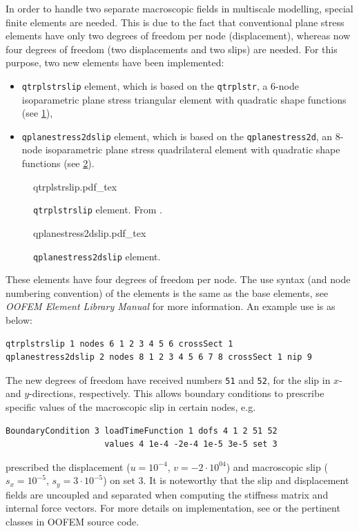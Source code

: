 \documentclass[11pt]{article}
\newcommand{\param}[1]{\texttt{#1}}
\begin{document}
In order to handle two separate macroscopic fields in multiscale modelling, special finite elements are needed. This is due to the fact that conventional plane stress elements have only two degrees of freedom per node (displacement), whereas now four degrees of freedom (two displacements and two slips) are needed. For this purpose, two new elements have been implemented:
\begin{itemize}
    \item \texttt{qtrplstrslip} element, which is based on the \texttt{qtrplstr}, a 6-node isoparametric plane stress triangular element with quadratic shape functions (see \cref{fig:qtrplstrslip}), 
    \item \texttt{qplanestress2dslip} element, which is based on the \texttt{qplanestress2d}, an 8-node isoparametric plane stress quadrilateral element with quadratic shape functions (see \cref{fig:qplanestress2dslip}).
\end{itemize}

\begin{figure}[H]
    \centering
    \def\svgwidth{0.5\textwidth}
    {qtrplstrslip.pdf_tex}
    \caption{\texttt{qtrplstrslip} element. From \cite{PaperB}.}
    \label{fig:qtrplstrslip}
\end{figure}

\begin{figure}[H]
    \centering
    \def\svgwidth{0.5\textwidth}
    {qplanestress2dslip.pdf_tex}
    \caption{\texttt{qplanestress2dslip} element.}
    \label{fig:qplanestress2dslip}
\end{figure}

\noindent These elements have four degrees of freedom per node. 
The use syntax (and node numbering convention) of the elements is the same as the base elements, see \textit{OOFEM Element Library Manual} for more information. An example use is as below:

\begin{lstlisting}[style=oofem,language=oofeminput]
qtrplstrslip 1 nodes 6 1 2 3 4 5 6 crossSect 1
qplanestress2dslip 2 nodes 8 1 2 3 4 5 6 7 8 crossSect 1 nip 9
\end{lstlisting}

The new degrees of freedom have received numbers \param{51} and \param{52}, for the slip in $x$- and $y$-directions, respectively. 
This allows boundary conditions to prescribe specific values of the macroscopic slip in certain nodes, e.g.
\begin{lstlisting}[style=oofem,language=oofeminput]
BoundaryCondition 3 loadTimeFunction 1 dofs 4 1 2 51 52 
                    values 4 1e-4 -2e-4 1e-5 3e-5 set 3
\end{lstlisting}
prescribed the displacement ($u = 10^{-4}$, $v = -2\cdot10^{04}$) and macroscopic slip ($s_x = 10^{-5}$, $s_y=3\cdot10^{-5}$) on set 3.
It is noteworthy that the slip and displacement fields are uncoupled and separated when computing the stiffness matrix and internal force vectors. For more details on implementation, see \cite{PaperB} or the pertinent classes in OOFEM source code.
\end{document}
